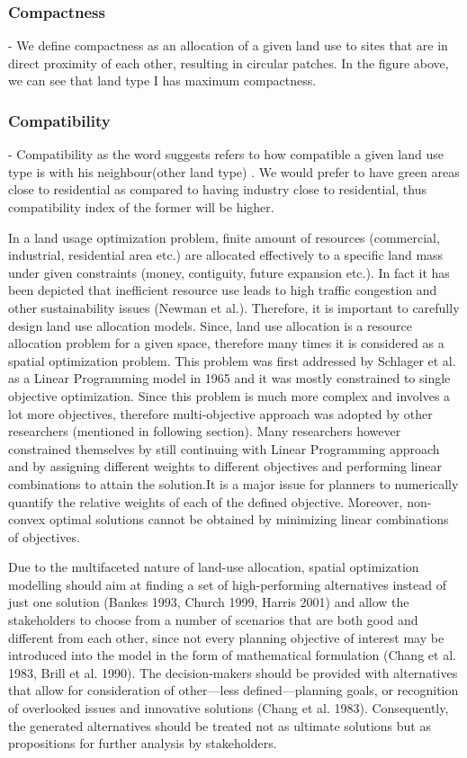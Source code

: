 \documentclass[twoside,10pt]{article}
\begin{document}
\subsubsection*{Compactness} - We define compactness as an allocation of a given land use to sites that are in direct proximity of each other, resulting in circular patches. In the figure above, we can see that land type I has maximum compactness.

\subsubsection*{Compatibility} - Compatibility  as the word suggests refers to how compatible a given land use type is with his neighbour(other land type) . We would prefer to have green areas close to residential as compared to having industry close to residential, thus compatibility index of the former will be higher.

In a land usage optimization problem, finite amount of resources (commercial, industrial, residential area etc.) are allocated effectively to a specific land mass under given constraints (money, contiguity, future expansion etc.). In fact it has been depicted that inefficient resource use leads to high traffic congestion and other sustainability issues (Newman et al.). Therefore, it is important to carefully design land use allocation models. Since, land use allocation is a resource allocation problem for a given space, therefore many times it is considered as a spatial optimization problem. This problem was first addressed by Schlager et al. as a Linear Programming model in 1965 and it was mostly constrained to single objective optimization. Since this problem is much more complex and involves a lot more objectives, therefore multi-objective approach was adopted by other researchers (mentioned in following section).  Many researchers however constrained themselves by still continuing with Linear Programming approach and by assigning different weights to different objectives and performing linear combinations to attain the solution.It is a major issue for planners to numerically quantify the relative weights of each of the defined objective. Moreover, non-convex optimal solutions cannot be obtained by minimizing linear combinations of objectives.


Due to the multifaceted nature of land-use allocation, spatial optimization modelling should aim at finding a set of high-performing alternatives instead of just one solution (Bankes 1993, Church 1999, Harris 2001) and allow the stakeholders to choose from a number of scenarios that are both good and different from each other, since not every planning objective of interest may be introduced into the
model in the form of mathematical formulation (Chang et al. 1983, Brill et al. 1990). The decision-makers should be provided with alternatives that allow for consideration of other—less defined—planning goals, or recognition of overlooked issues and innovative solutions (Chang et al. 1983). Consequently, the generated alternatives should be treated not as ultimate solutions but as propositions for further analysis by stakeholders.
\end{document}
